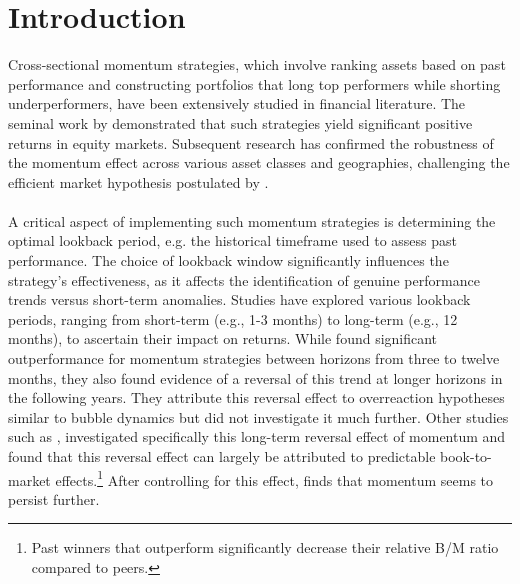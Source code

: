 \documentclass[a4paper,12pt,twoside]{article}
\begin{document}
    \clearpage

    \setcounter{page}{1}
	\tableofcontents
	
	\clearpage
	\listoffigures
	
	\listoftables
	
	\clearpage
    \setcounter{page}{1}
    \setlength{\parindent}{0pt}
    \setlength{\parskip}{8pt}

\section{Introduction}
Cross-sectional momentum strategies, which involve ranking assets based on past performance and constructing portfolios that long top performers while shorting underperformers, have been extensively studied in financial literature. The seminal work by \cite{jegadeesh1993returns} demonstrated that such strategies yield significant positive returns in equity markets. Subsequent research has confirmed the robustness of the momentum effect across various asset classes and geographies, challenging the efficient market hypothesis postulated by \cite{fama1970efficient}.
\\~\\
A critical aspect of implementing such momentum strategies is determining the optimal lookback period, e.g. the historical timeframe used to assess past performance. The choice of lookback window significantly influences the strategy's effectiveness, as it affects the identification of genuine performance trends versus short-term anomalies. Studies have explored various lookback periods, ranging from short-term (e.g., 1-3 months) to long-term (e.g., 12 months), to ascertain their impact on returns. While \cite{jegadeesh1993returns} found significant outperformance for momentum strategies between horizons from three to twelve months, they also found evidence of a reversal of this trend at longer horizons in the following years. They attribute this reversal effect to overreaction hypotheses similar to bubble dynamics but did not investigate it much further.
Other studies such as \cite{nagel2001overreaction}, investigated specifically this long-term reversal effect of momentum and found that this reversal effect can largely be attributed to predictable book-to-market effects.\footnote{Past winners that outperform significantly decrease their relative B/M ratio compared to peers.} After controlling for this effect, \cite{nagel2001overreaction} finds that momentum seems to persist further.
\end{document}

